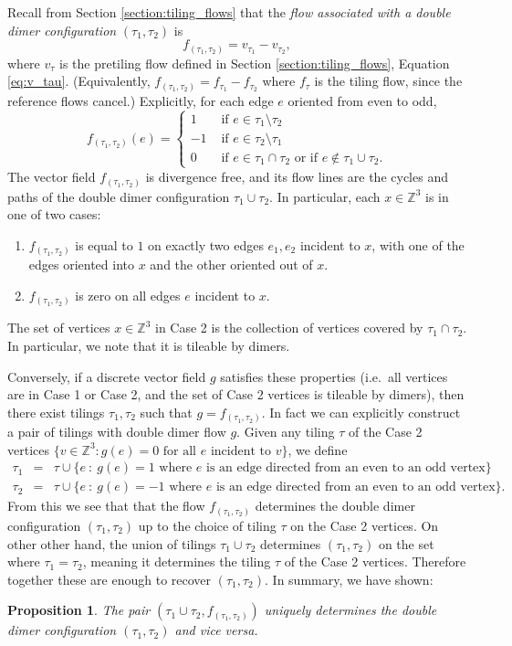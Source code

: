 \documentclass[11pt]{article}
\newtheorem{prop}[thm]{Proposition}
\theoremstyle{remark}
\theoremstyle{definition}
\newcommand{\m}[1]{\mathbb{#1}}
\begin{document}
Recall from Section \ref{section:tiling_flows} that the \textit{flow associated with a double dimer configuration} $(\tau_1,\tau_2)$ is
$$f_{(\tau_1, \tau_2)}=v_{\tau_1}-v_{\tau_2},$$
where $v_\tau$ is the pretiling flow defined in Section \ref{section:tiling_flows}, Equation \eqref{eq:v_tau}. (Equivalently, $f_{(\tau_1, \tau_2)} = f_{\tau_1} - f_{\tau_2}$ where $f_\tau$ is the tiling flow, since the reference flows cancel.) Explicitly, for each edge $e$ oriented from even to odd,
 $$f_{(\tau_1, \tau_2)}(e)=\begin{cases}1&\text{ if }e\in \tau_1\setminus \tau_2\\
 -1&\text{ if }e\in \tau_2\setminus \tau_1\\
 0&\text{ if }e\in \tau_1\cap \tau_2\text{ or if }e\not\in \tau_1\cup\tau_2.
 \end{cases}$$
The vector field $f_{(\tau_1,\tau_2)}$ is divergence free, and its flow lines are the cycles and paths of the double dimer configuration $\tau_1\cup \tau_2$. In particular, each $x\in \m Z^3$ is in one of two cases:
\begin{enumerate}
    \item $f_{(\tau_1,\tau_2)}$ is equal to $1$ on exactly two edges $e_1,e_2$ incident to $x$, with one of the edges oriented into $x$ and the other oriented out of $x$.  
    \item $f_{(\tau_1,\tau_2)}$ is zero on all edges $e$ incident to $x$. 
\end{enumerate}
The set of vertices $x\in \m Z^3$ in Case 2 is the collection of vertices covered by $\tau_1\cap \tau_2$. In particular, we note that it is tileable by dimers. 

Conversely, if a discrete vector field $g$ satisfies these properties (i.e.\ all vertices are in Case 1 or Case 2, and the set of Case 2 vertices is tileable by dimers), then there exist tilings $\tau_1,\tau_2$ such that $g = f_{(\tau_1,\tau_2)}$. In fact we can explicitly construct a pair of tilings with double dimer flow $g$. Given any tiling $\tau$ of the Case 2 vertices $\{v\in \m Z^3 : g(e) = 0 \text{ for all } e \text{ incident to }v\}$, we define
\begin{eqnarray*}
\tau_1&=& \tau\cup\{e~:~g(e)=1\text{ where }e\text{ is an edge directed from an even to an odd vertex}\}\\
\tau_2&=& \tau\cup\{e~:~g(e)=-1\text{ where }e\text{ is an edge directed from an even to an odd vertex}\}.
\end{eqnarray*}
From this we see that that the flow $f_{(\tau_1,\tau_2)}$ determines the double dimer configuration $(\tau_1,\tau_2)$ up to the choice of tiling $\tau$ on the Case 2 vertices. On other other hand, the union of tilings $\tau_1\cup \tau_2$ determines $(\tau_1,\tau_2)$ on the set where $\tau_1 = \tau_2$, meaning it determines the tiling $\tau$ of the Case 2 vertices. Therefore together these are enough to recover $(\tau_1,\tau_2)$. In summary, we have shown:
\begin{prop}\label{prop: injection_tiling_to_flow}
	The pair $(\tau_1 \cup \tau_2, f_{(\tau_1,\tau_2)})$ uniquely determines the double dimer configuration $(\tau_1,\tau_2)$ and vice versa.
\end{prop}
\end{document}
